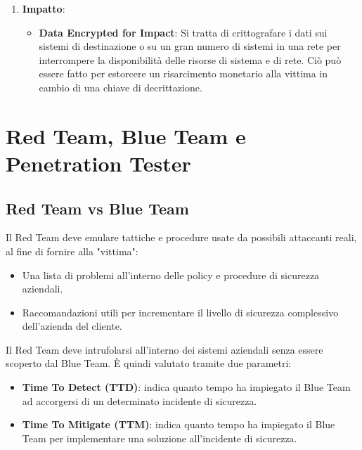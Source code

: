 \documentclass{article}
\begin{document}
\begin{enumerate}
\begin{itemize}
            \item \textbf{Data Transfer Size Limits}: Si tratta di esfiltrare i dati in blocchi di dimensioni fisse anziché in file interi, oppure limitare le dimensioni dei pacchetti al di sotto di determinate soglie. Questo approccio può essere utilizzato per evitare di attivare avvisi di soglia per il trasferimento dati in rete.
        \end{itemize}

    \item \textbf{Impatto}:
        \begin{itemize}
            \item \textbf{Data Encrypted for Impact}: Si tratta di crittografare i dati sui sistemi di destinazione o su un gran numero di sistemi in una rete per interrompere la disponibilità delle risorse di sistema e di rete. Ciò può essere fatto per estorcere un risarcimento monetario alla vittima in cambio di una chiave di decrittazione.
        \end{itemize}   
\end{enumerate}

\newpage
\section{Red Team, Blue Team e Penetration Tester}
\subsection{Red Team vs Blue Team}
Il Red Team deve emulare tattiche e procedure usate da possibili attaccanti reali, al fine di fornire alla "vittima":
\begin{itemize}
    \item Una lista di problemi all'interno delle policy e procedure di sicurezza aziendali.
    \item Raccomandazioni utili per incrementare il livello di sicurezza complessivo dell’azienda del cliente.
\end{itemize}

Il Red Team deve intrufolarsi all'interno dei sistemi aziendali senza essere scoperto dal Blue Team. È quindi valutato tramite due parametri:
\begin{itemize}
    \item \textbf{Time To Detect (TTD)}: indica quanto tempo ha impiegato il Blue Team ad accorgersi di un determinato incidente di sicurezza.
    \item \textbf{Time To Mitigate (TTM)}: indica quanto tempo ha impiegato il Blue Team per 
    implementare una soluzione all’incidente di sicurezza.
\end{itemize}
\end{document}
